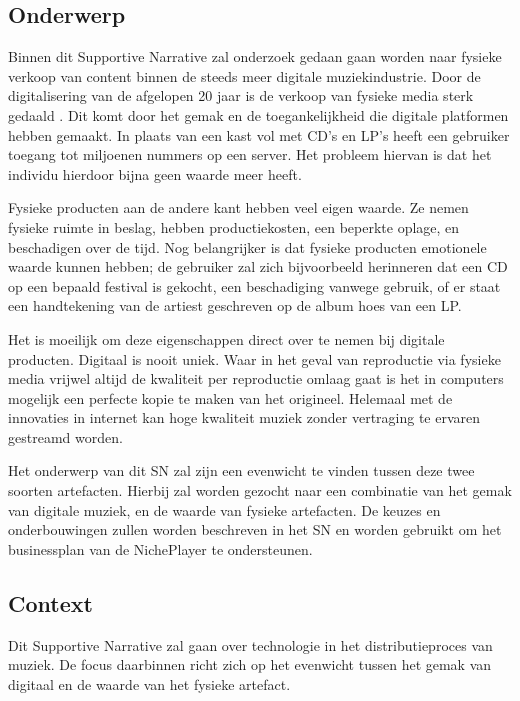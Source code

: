 \subsection{Onderwerp}
Binnen dit Supportive Narrative zal onderzoek gedaan gaan worden naar fysieke verkoop van content binnen de steeds meer digitale muziekindustrie. Door de digitalisering van de afgelopen 20 jaar is de verkoop van fysieke media sterk gedaald \cite{dong2022valueofmusic}. Dit komt door het gemak en de toegankelijkheid die digitale platformen hebben gemaakt. In plaats van een kast vol met CD's en LP's heeft een gebruiker toegang tot miljoenen nummers op een server. Het probleem hiervan is dat het individu hierdoor bijna geen waarde meer heeft.

Fysieke producten aan de andere kant hebben veel eigen waarde. Ze nemen fysieke ruimte in beslag, hebben productiekosten, een beperkte oplage, en beschadigen over de tijd. Nog belangrijker is dat fysieke producten emotionele waarde kunnen hebben; de gebruiker zal zich bijvoorbeeld herinneren dat een CD op een bepaald festival is gekocht, een beschadiging vanwege gebruik, of er staat een handtekening van de artiest geschreven op de album hoes van een LP.

Het is moeilijk om deze eigenschappen direct over te nemen bij digitale producten. Digitaal is nooit uniek. Waar in het geval van reproductie via fysieke media vrijwel altijd de kwaliteit per reproductie omlaag gaat is het in computers mogelijk een perfecte kopie te maken van het origineel. Helemaal met de innovaties in internet kan hoge kwaliteit muziek zonder vertraging te ervaren gestreamd worden.

Het onderwerp van dit SN zal zijn een evenwicht te vinden tussen deze twee soorten artefacten. Hierbij zal worden gezocht naar een combinatie van het gemak van digitale muziek, en de waarde van fysieke artefacten. De keuzes en onderbouwingen zullen worden beschreven in het SN en worden gebruikt om het businessplan van de NichePlayer te ondersteunen.

\subsection{Context}
Dit Supportive Narrative zal gaan over technologie in het distributieproces van muziek. De focus daarbinnen richt zich op het evenwicht tussen het gemak van digitaal en de waarde van het fysieke artefact.

